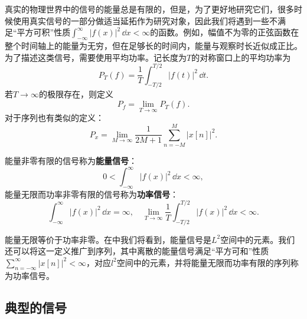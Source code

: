 真实的物理世界中的信号的能量总是有限的，但是，为了更好地研究它们，很多时候使用真实信号的一部分做适当延拓作为研究对象，因此我们将遇到一些不满足“平方可积”性质$\int_{-\infty}^{\infty}|f(x)|^2\,\dd x<\infty$的函数。例如，幅值不为零的正弦函数在整个时间轴上的能量为无穷，但在足够长的时间内，能量与观察时长近似成正比。为了描述这类信号，需要使用平均功率。记长度为$T$的对称窗口上的平均功率为
\begin{equation}
    P_T(f)=\frac{1}{T}\int_{-T/2}^{T/2}|f(t)|^2\,\dd t.
\end{equation}
若$T\to\infty$的极限存在，则定义
\begin{equation}
    P_f=\lim_{T\to\infty}P_T(f).
\end{equation}
对于序列也有类似的定义：
\begin{equation}
    P_x=\lim_{M\to\infty}\frac{1}{2M+1}\sum_{n=-M}^M |x[n]|^2.
\end{equation}
\begin{definition}[能量信号与功率信号]
    能量非零有限的信号称为\textbf{能量信号}：
    \begin{equation}
        0<\int_{-\infty}^{\infty}|f(x)|^2\,\dd x<\infty,
    \end{equation}
    能量无限而功率非零有限的信号称为\textbf{功率信号}：
    \begin{equation}
        \int_{-\infty}^{\infty}|f(x)|^2\,\dd x=\infty,\quad \lim_{T \to \infty}\frac{1}{T}\int_{-T/2}^{T/2}|f(x)|^2\,\dd x<\infty.
    \end{equation}
\end{definition}

能量无限等价于功率非零。在中我们将看到，能量信号是$L^2$空间中的元素。我们还可以将这一定义推广到序列，其中离散的能量信号满足“平方可和”性质$\sum_{n=-\infty}^{\infty}|x[n]|^2<\infty$，对应$l^2$空间中的元素，并将能量无限而功率有限的序列称为功率信号。

\subsection{典型的信号}\label{sub:ordinary_signal}
